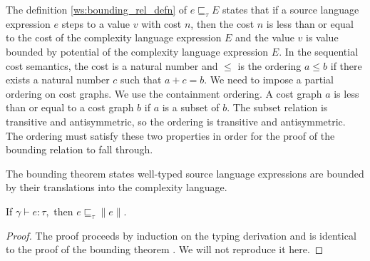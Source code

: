 %
The definition \ref{ws:bounding_rel_defn} of $e \sqsubseteq_\tau E$ states that
if a source language expression $e$ steps to a value $v$ with cost $n$, then
the cost $n$ is less than or equal to the cost of the complexity language
expression $E$ and the value $v$ is value bounded by potential of the
complexity language expression $E$. In the sequential cost semantics, the cost
is a natural number and $\leq$ is the ordering $a \leq b$ if there exists a
natural number $c$ such that $a+c=b$. We need to impose a partial ordering on
cost graphs. We use the containment ordering. A cost graph $a$ is less than or
equal to a cost graph $b$ if $a$ is a subset of $b$. The subset relation is
transitive and antisymmetric, so the ordering is transitive and antisymmetric.
The ordering must satisfy these two properties in order for the proof of the
bounding relation to fall through.


The bounding theorem states well-typed source language expressions are bounded
by their translations into the complexity language.
%
\begin{theorem}
  If $\gamma \vdash e : \tau, $ then $e \sqsubseteq_\tau \|e\|$.
\end{theorem}
\begin{proof}
  The proof proceeds by induction on the typing derivation and is identical to
  the proof of the bounding theorem \citet{Danner2015}. We will not reproduce
  it here.
\end{proof}

